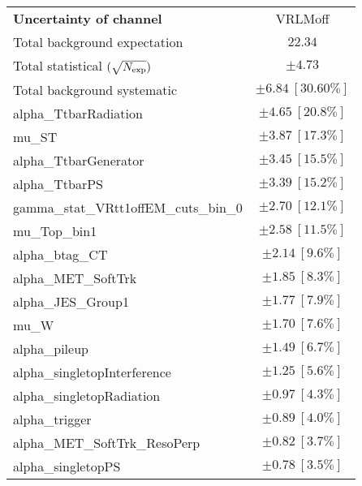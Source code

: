 
\begin{table}
\begin{center}
\setlength{\tabcolsep}{0.0pc}
\begin{tabular*}{\textwidth}{@{\extracolsep{\fill}}lc}
\noalign{\smallskip}\hline\noalign{\smallskip}
{\bf Uncertainty of channel}                                    & VRLMoff         \\
\noalign{\smallskip}\hline\noalign{\smallskip}
Total background expectation             &  $22.34$       \\
\noalign{\smallskip}\hline\noalign{\smallskip}
Total statistical $(\sqrt{N_{\rm exp}})$              & $\pm 4.73$       \\
Total background systematic               & $\pm 6.84\ [30.60\%] $             \\
\noalign{\smallskip}\hline\noalign{\smallskip}
\noalign{\smallskip}\hline\noalign{\smallskip}
alpha\_TtbarRadiation         & $\pm 4.65\ [20.8\%] $       \\
mu\_ST         & $\pm 3.87\ [17.3\%] $       \\
alpha\_TtbarGenerator         & $\pm 3.45\ [15.5\%] $       \\
alpha\_TtbarPS         & $\pm 3.39\ [15.2\%] $       \\
gamma\_stat\_VRtt1offEM\_cuts\_bin\_0         & $\pm 2.70\ [12.1\%] $       \\
mu\_Top\_bin1         & $\pm 2.58\ [11.5\%] $       \\
alpha\_btag\_CT         & $\pm 2.14\ [9.6\%] $       \\
alpha\_MET\_SoftTrk         & $\pm 1.85\ [8.3\%] $       \\
alpha\_JES\_Group1         & $\pm 1.77\ [7.9\%] $       \\
mu\_W         & $\pm 1.70\ [7.6\%] $       \\
alpha\_pileup         & $\pm 1.49\ [6.7\%] $       \\
alpha\_singletopInterference         & $\pm 1.25\ [5.6\%] $       \\
alpha\_singletopRadiation         & $\pm 0.97\ [4.3\%] $       \\
alpha\_trigger         & $\pm 0.89\ [4.0\%] $       \\
alpha\_MET\_SoftTrk\_ResoPerp         & $\pm 0.82\ [3.7\%] $       \\
alpha\_singletopPS         & $\pm 0.78\ [3.5\%] $       \\

\end{tabular*}
\end{center}
\end{table}
